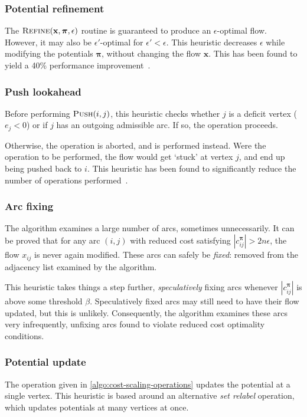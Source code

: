 \subsubsection{Potential refinement} \label{appendix:impl-csheuristics-potential-refinement}
The $\textproc{Refine}(\mathbf{x},\boldsymbol{\pi},\epsilon)$ routine is guaranteed to produce an $\epsilon$-optimal flow. However, it may also be $\epsilon'$-optimal for $\epsilon' < \epsilon$. This heuristic decreases $\epsilon$ while modifying the potentials $\boldsymbol{\pi}$, without changing the flow $\mathbf{x}$. This has been found to yield a 40\% performance improvement~\cite{Bunnagel:1998}.

\subsubsection{Push lookahead}
Before performing $\textproc{Push}(i,j)$, this heuristic checks whether $j$ is a deficit vertex ($e_j < 0$) or if $j$ has an outgoing admissible arc. If so, the  operation proceeds.

Otherwise, the  operation is aborted, and  is performed instead. Were the  operation to be performed, the flow would get `stuck' at vertex $j$, and end up being pushed back to $i$. This heuristic has been found to significantly reduce the number of  operations performed~\cite{Goldberg:1997}.

\subsubsection{Arc fixing}
The algorithm examines a large number of arcs, sometimes unnecessarily. It can be proved that for any arc $(i,j)$ with reduced cost satisfying $\left|c^{\boldsymbol{\pi}}_{ij}\right| > 2n\epsilon$, the flow $x_{ij}$ is never again modified. These arcs can safely be \emph{fixed}: removed from the adjacency list examined by the algorithm. 

This heuristic takes things a step further, \emph{speculatively} fixing arcs whenever $\left|c^{\boldsymbol{\pi}}_{ij}\right|$ is above some threshold $\beta$. Speculatively fixed arcs may still need to have their flow updated, but this is unlikely. Consequently, the algorithm examines these arcs very infrequently, unfixing arcs found to violate reduced cost optimality conditions.

\subsubsection{Potential update}
The  operation given in \cref{algo:cost-scaling-operations} updates the potential at a single vertex. This heuristic is based around an alternative \emph{set relabel} operation, which updates potentials at many vertices at once.

